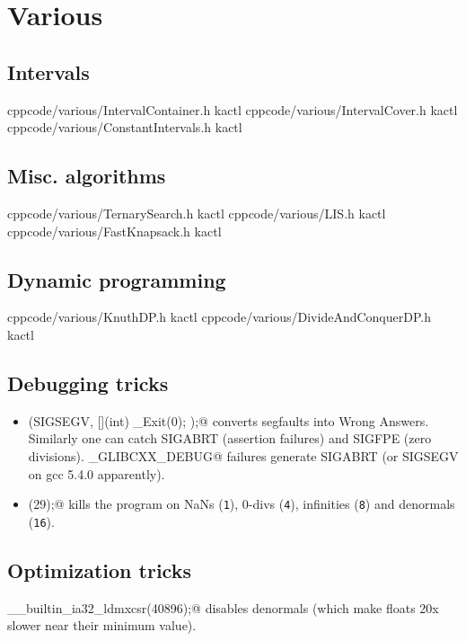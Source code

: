 \chapter{Various}

\section{Intervals}
    {}{}
    {cpp}{code/various/IntervalContainer.h}
    {kactl}
    {}{}
    {cpp}{code/various/IntervalCover.h}
    {kactl}
    {}{}
    {cpp}{code/various/ConstantIntervals.h}
    {kactl}

\section{Misc. algorithms}
    {}{}
    {cpp}{code/various/TernarySearch.h}
    {kactl}
    {}{}
    {cpp}{code/various/LIS.h}
    {kactl}
    {}{}
    {cpp}{code/various/FastKnapsack.h}
    {kactl}

\section{Dynamic programming}
    {}{}
    {cpp}{code/various/KnuthDP.h}
    {kactl}
    {}{}
    {cpp}{code/various/DivideAndConquerDP.h}
    {kactl}

\section{Debugging tricks}
	\begin{itemize}
		\item \verb@signal(SIGSEGV, [](int) { _Exit(0); });@ converts segfaults into Wrong Answers.
			Similarly one can catch SIGABRT (assertion failures) and SIGFPE (zero divisions).
			\verb@_GLIBCXX_DEBUG@ failures generate SIGABRT (or SIGSEGV on gcc 5.4.0 apparently).
		\item \verb@feenableexcept(29);@ kills the program on NaNs (\texttt 1), 0-divs (\texttt 4), infinities (\texttt 8) and denormals (\texttt{16}).
	\end{itemize}

\section{Optimization tricks}
	\verb@__builtin_ia32_ldmxcsr(40896);@ disables denormals (which make floats 20x slower near their minimum value).
